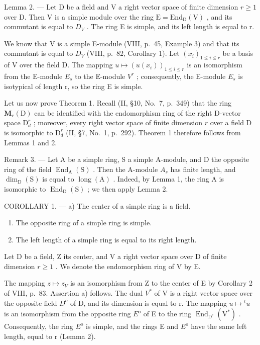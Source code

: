 Lemma 2. --- Let D be a field and V a right vector space of finite dimension \(r \geqslant 1\) over D. Then V is a simple module over the ring \(\mathrm{E} = \mathrm{End}_{\mathrm{D}}(\mathrm{V})\) , and its commutant is equal to \(D_{V}\) . The ring E is simple, and its left length is equal to r.

We know that V is a simple E-module (VIII, p.~45, Example 3) and that its commutant is equal to \(D_{V}\) (VIII, p.~82, Corollary 1). Let \((x_{i})_{1\leqslant i\leqslant r}\) be a basis of V over the field D. The mapping \(u\mapsto(u(x_{i}))_{1\leqslant i\leqslant r}\) is an isomorphism from the E-module \(E_{s}\) to the E-module \(V^{r}\) ; consequently, the E-module \(E_{s}\) is isotypical of length r, so the ring E is simple.

Let us now prove Theorem 1. Recall (II, §10, No.~7, p.~349) that the ring \(\mathbf{M}_r(\mathrm{D})\) can be identified with the endomorphism ring of the right D-vector space \(\mathrm{D}_d^r\) ; moreover, every right vector space of finite dimension \(r\) over a field D is isomorphic to \(\mathrm{D}_d^r\) (II, §7, No.~1, p.~292). Theorem 1 therefore follows from Lemmas 1 and 2.

Remark 3. --- Let A be a simple ring, S a simple A-module, and D the opposite ring of the field \(\operatorname{End}_{\mathrm{A}}(\mathrm{S})\) . Then the A-module \(A_{s}\) has finite length, and \(\dim_{\mathrm{D}}(\mathrm{S})\) is equal to \(\operatorname{long}(\mathrm{A})\) . Indeed, by Lemma 1, the ring A is isomorphic to \(\operatorname{End}_{\mathrm{D}}(\mathrm{S})\) ; we then apply Lemma 2.

COROLLARY 1. --- a) The center of a simple ring is a field.

\begin{enumerate}
\def\labelenumi{\alph{enumi})}
\setcounter{enumi}{1}
\item
  The opposite ring of a simple ring is simple.
\item
  The left length of a simple ring is equal to its right length.
\end{enumerate}

Let D be a field, Z its center, and V a right vector space over D of finite dimension \(r \geqslant 1\) . We denote the endomorphism ring of V by E.

The mapping \(z \mapsto z_{V}\) is an isomorphism from Z to the center of E by Corollary 2 of VIII, p.~83. Assertion a) follows. The dual \(V^{*}\) of V is a right vector space over the opposite field \(D^{o}\) of D, and its dimension is equal to r. The mapping \(u \mapsto {}^{t}u\) is an isomorphism from the opposite ring \(E^{o}\) of E to the ring \(\operatorname{End}_{\mathrm{D}^{\circ}}(\mathrm{V}^{*})\) . Consequently, the ring \(E^{o}\) is simple, and the rings E and \(E^{o}\) have the same left length, equal to r (Lemma 2).

